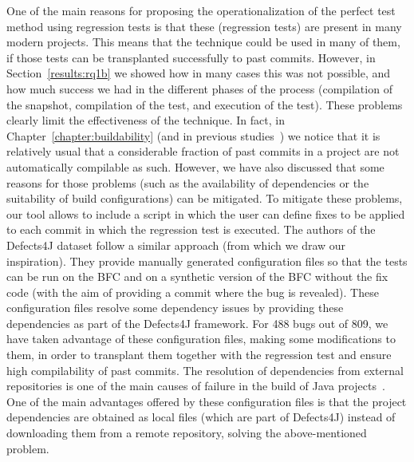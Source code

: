 One of the main reasons for proposing the operationalization of the perfect test method using regression tests is that these (regression tests) are present in many modern projects. This means that the technique could be used in many of them, if those tests can be transplanted successfully to past commits. However, in Section~\ref{results:rq1b} we showed how in many cases this was not possible, and how much success we had in the different phases of the process (compilation of the snapshot, compilation of the test, and execution of the test). These problems clearly limit the effectiveness of the technique.
In fact, in Chapter~\ref{chapter:buildability} (and in previous studies~\cite{tufano2017there}) we notice that it is relatively usual that a considerable fraction of past commits in a project are not automatically compilable as such. 
However, we have also discussed that some reasons for those problems (such as the availability of dependencies or the suitability of build configurations) can be mitigated. 
To mitigate these problems, our tool allows to include a script in which the user can define fixes to be applied to each commit in which the regression test is executed. 
The authors of the Defects4J dataset follow a similar approach (from which we draw our inspiration). 
They provide manually generated configuration files so that the tests can be run on the BFC and on a synthetic version of the BFC without the fix code (with the aim of providing a commit where the bug is revealed).
These configuration files resolve some dependency issues by providing these dependencies as part of the Defects4J framework.
For 488 bugs out of 809, we have taken advantage of these configuration files, making some modifications to them, in order to transplant them together with the regression test and ensure high compilability of past commits.
The resolution of dependencies from external repositories is one of the main causes of failure in the build of Java projects~\cite{tufano2017there}.
One of the main advantages offered by these configuration files is that the project dependencies are obtained as local files (which are part of Defects4J) instead of downloading them from a remote repository, solving the above-mentioned problem.

